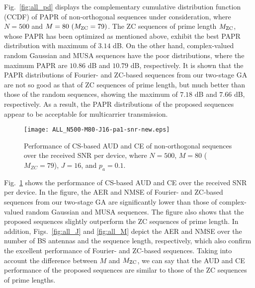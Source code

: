 \documentclass[journal]{IEEEtran}
\numberwithin{const2}{const}
\begin{document}
Fig.~\ref{fig:all_pd} displays the complementary cumulative distribution function (CCDF) of 
PAPR of non-orthogonal sequences under consideration, 
where $N=500$ and $M=80~(M_{\rm ZC} = 79)$.
The ZC sequences of prime length $M_{\rm ZC}$, whose PAPR has been optimized as mentioned above,
exhibit the best PAPR distribution with maximum of $3.14 $ dB.
On the other hand, complex-valued random Gaussian and MUSA sequences have the poor distributions,
where the maximum PAPR are $10.86$ dB and $10.79$ dB, respectively.
It is shown that the PAPR distributions of Fourier- and ZC-based sequences from our two-stage GA
are not so good as that of ZC sequences of prime length, but much better than those of the random sequences,
showing the maximum of $7.18$ dB and $7.66$ dB, respectively.
As a result, the PAPR distributions of the proposed sequences appear to be acceptable 
for multicarrier transmission. %



\begin{figure}[!t]
	\centering
	\texttt{[image: ALL\_N500-M80-J16-pa1-snr-new.eps]}
	\caption{Performance of CS-based AUD and CE of non-orthogonal sequences over the received SNR per device, 
		where $N=500$, $M=80$ ($M_{ZC} = 79$), $J=16$, and $p_a = 0.1$.}
	\label{fig:all_snr}
\end{figure}




Fig.~\ref{fig:all_snr} shows the performance of CS-based AUD and CE %
over the received SNR per device.
In the figure, the AER and NMSE of Fourier- and ZC-based sequences %
from our two-stage GA
are significantly lower than those of complex-valued random Gaussian and MUSA sequences.
The figure also shows that the proposed sequences slightly outperform the ZC sequences of prime length. %
In addition, Figs.~\ref{fig:all_J} and \ref{fig:all_M} depict the AER and NMSE over the number of BS antennas
and the sequence length, respectively,
which also confirm the excellent performance of Fourier- and ZC-based sequences.
Taking into account the difference between $M$ and $M_{\rm ZC}$, %
we can say that %
the AUD and CE performance of the proposed sequences are similar to
those of the ZC sequences of prime lengths.
\end{document}
